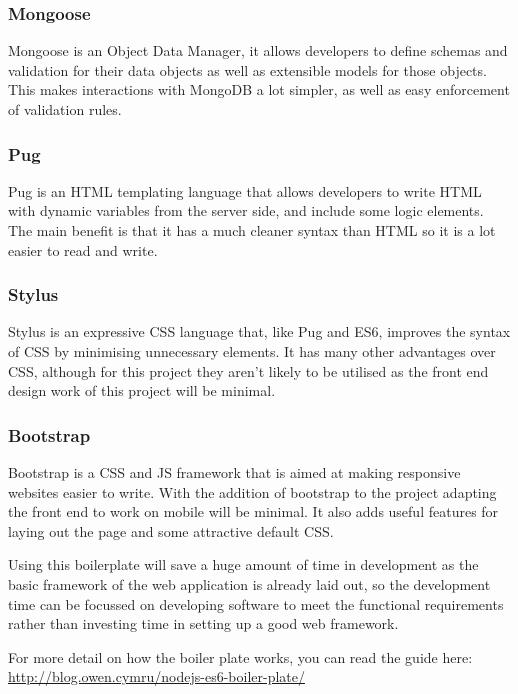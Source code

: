     \subsubsection*{Mongoose}

    Mongoose is an Object Data Manager, it allows developers to define schemas and validation for their data objects as well as extensible models for those objects. This makes interactions with MongoDB a lot simpler, as well as easy enforcement of validation rules.

    \subsubsection*{Pug}

    Pug is an HTML templating language that allows developers to write HTML with dynamic variables from the server side, and include some logic elements. The main benefit is that it has a much cleaner syntax than HTML so it is a lot easier to read and write. 

    \subsubsection*{Stylus}

    Stylus is an expressive CSS language that, like Pug and ES6, improves the syntax of CSS by minimising unnecessary elements. It has many other advantages over CSS, although for this project they aren't likely to be utilised as the front end design work of this project will be minimal. 

    \subsubsection*{Bootstrap}

    Bootstrap is a CSS and JS framework that is aimed at making responsive websites easier to write. With the addition of bootstrap to the project adapting the front end to work on mobile will be minimal. It also adds useful features for laying out the page and some attractive default CSS. 

Using this boilerplate will save a huge amount of time in development as the basic framework of the web application is already laid out, so the development time can be focussed on developing software to meet the functional requirements rather than investing time in setting up a good web framework. 

For more detail on how the boiler plate works, you can read the guide here: \url{http://blog.owen.cymru/nodejs-es6-boiler-plate/}

